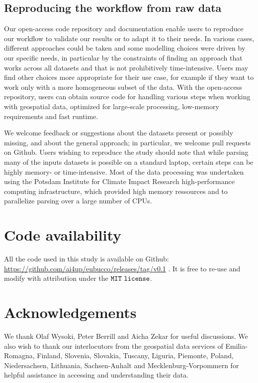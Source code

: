 \documentclass[fleqn,10pt]{wlscirep}
\begin{document}
\subsection*{Reproducing the workflow from raw data}
Our open-access code repository\cite{eubucco-0.1-code2022} and documentation enable users to reproduce our workflow to validate our results or to adapt it to their needs. In various cases, different approaches could be taken and some modelling choices were driven by our specific needs, in particular by the constraints of finding an approach that works across all datasets and that is not prohibitively time-intensive. Users may find other choices more appropriate for their use case, for example if they want to work only with a more homogeneous subset of the data. With the open-access repository, users can obtain source code for handling various steps when working with geospatial data, optimized for large-scale processing, low-memory requirements and fast runtime. 

We welcome feedback or suggestions about the datasets present or possibly missing, and about the general approach; in particular, we welcome pull requests on Github. Users wishing to reproduce the study should note that while parsing many of the inputs datasets is possible on a standard laptop, certain steps can be highly memory- or time-intensive. Most of the data processing was undertaken using the Potsdam Institute for Climate Impact Research high-performance computing infrastructure, which provided high memory ressources and to parallelize parsing over a large number of CPUs.

\section*{Code availability}

All the code used in this study is available on Github: \url{https://github.com/ai4up/eubucco/releases/tag/v0.1} \cite{eubucco-0.1-code2022}. It is free to re-use and modify with attribution under the ${\tt MIT\ license}$.





\section*{Acknowledgements} 

We thank Olaf Wysoki, Peter Berrill and Aicha Zekar for useful discussions. We also wish to thank our interlocutors from the geospatial data services of Emilia-Romagna, Finland, Slovenia, Slovakia, Tuscany, Liguria, Piemonte, Poland, Niedersachsen, Lithuania, Sachsen-Anhalt and Mecklenburg-Vorpommern  for helpful assistance in accessing and understanding their data. 
\end{document}
